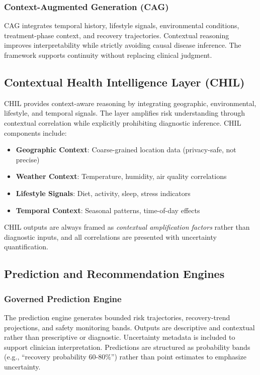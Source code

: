 \documentclass[conference]{IEEEtran}
\begin{document}
\subsubsection{Context-Augmented Generation (CAG)}
CAG integrates temporal history, lifestyle signals, environmental conditions, treatment-phase context, and recovery trajectories. Contextual reasoning improves interpretability while strictly avoiding causal disease inference. The framework supports continuity without replacing clinical judgment.

\subsection{Contextual Health Intelligence Layer (CHIL)}
CHIL provides context-aware reasoning by integrating geographic, environmental, lifestyle, and temporal signals. The layer amplifies risk understanding through contextual correlation while explicitly prohibiting diagnostic inference. CHIL components include:

\begin{itemize}
    \item \textbf{Geographic Context}: Coarse-grained location data (privacy-safe, not precise)
    \item \textbf{Weather Context}: Temperature, humidity, air quality correlations
    \item \textbf{Lifestyle Signals}: Diet, activity, sleep, stress indicators
    \item \textbf{Temporal Context}: Seasonal patterns, time-of-day effects
\end{itemize}

CHIL outputs are always framed as \textit{contextual amplification factors} rather than diagnostic inputs, and all correlations are presented with uncertainty quantification.

\subsection{Prediction and Recommendation Engines}

\subsubsection{Governed Prediction Engine}
The prediction engine generates bounded risk trajectories, recovery-trend projections, and safety monitoring bands. Outputs are descriptive and contextual rather than prescriptive or diagnostic. Uncertainty metadata is included to support clinician interpretation. Predictions are structured as probability bands (e.g., ``recovery probability 60-80\%'') rather than point estimates to emphasize uncertainty.
\end{document}
